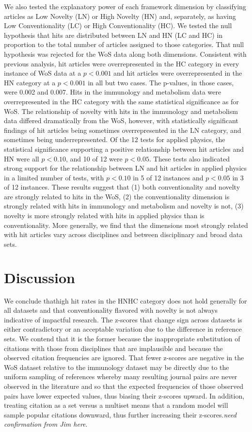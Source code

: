 \documentclass[NETN]{stjour}
\begin{document}
We also tested the explanatory power of each framework dimension by classifying articles as Low Novelty (LN) or High Novelty (HN) and, separately, as having Low Conventionality (LC) or High Conventionality (HC).  We tested the null hypothesis that hits are distributed between LN and HN (LC and HC) in proportion to the total number of articles assigned to those categories.  That null hypothesis was rejected for the WoS data along both dimensions. Consistent with previous analysis, hit articles were overrepresented in the HC category in every instance of WoS data at a $p<0.001$ and hit articles were overrepresented in the HN category at a $p<0.001$ in all but two cases.  The p-values, in those cases, were 0.002 and 0.007.  Hits in the immunology and metabolism data were overrepresented in the HC category with the same statistical significance as for WoS. The relationship of novelty with hits in the immunology and metabolism data differed dramatically from the WoS, however, with statistically significant findings of hit articles being sometimes overrepresented in the LN category, and sometimes being underrepresented.  Of the 12 tests for applied physics, the statistical significance supporting a positive relationship between hit articles and HN were all $p<0.10$, and 10 of 12 were $p<0.05$.  These tests also indicated strong support for the relationship between LN and hit articles in applied physics in a limited number of tests, with $p<0.10$ in 5 of 12 instances and $p < 0.05$ in 3 of 12 instances. These results suggest that (1) both conventionality and novelty are strongly related to hits in the WoS, (2) the conventionality dimension is strongly related with hits in immunology and metabolism and novelty is not, (3) novelty is more strongly related with hits in applied physics than is conventionality. More generally, we find that the dimensions most strongly related with hit articles vary across disciplines and between disciplinary and broad data sets. 


\section{Discussion}

We conclude thathigh hit rates in the HNHC category does not hold generally for all datasets and that conventionality flavored with novelty is not always indicative of impactful research. The z-scores that change sign across datasets is either contradictory or an acceptable variation due to the difference in reference sets. We contend that it is the former because the inappropriate substitution of citations with those from disciplines that are implausible and because the observed citation frequencies are ignored. That fewer z-scores are negative in the WoS dataset relative to the immunology dataset may be directly due to the uniform sampling of references whereby many resulting journal pairs are never observed in the literature and so that the expected frequencies of those observed pairs have lower expected values, thus biasing their z-scores upward. In addition, treating citation as a set versus a multiset means that a random model will sample popular citations downward, thus further increasing their z-scores.\emph{need confirmation from Jim here}.
\end{document}
